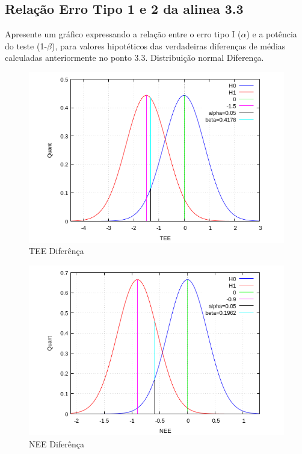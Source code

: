 \subsection{Relação Erro Tipo 1 e 2 da alinea 3.3}
\noindent
Apresente um gráfico expressando a relação entre o erro tipo I ($\alpha$) e a potência do teste (1-$\beta$), para valores hipotéticos das verdadeiras diferenças de médias calculadas anteriormente no ponto 3.3.
\newpage
Distribuição normal Diferença. \\
\begin{minipage}[!b]{0.45\linewidth}
\begin{figure}[H]
\centering
\includegraphics[scale=0.4]{./image/TEE_DIFF.png}
\caption{TEE Diferênça}
\label{TEEDIFF}
\end{figure}
\end{minipage}
\hspace{1cm}
\begin{minipage}[!b]{0.45\linewidth}
\begin{figure}[H]
\centering
\includegraphics[scale=0.4]{./image/NEE_DIFF.png}
\caption{NEE Diferênça}
\label{NEEDIFF}
\end{figure}
\end{minipage} \\
